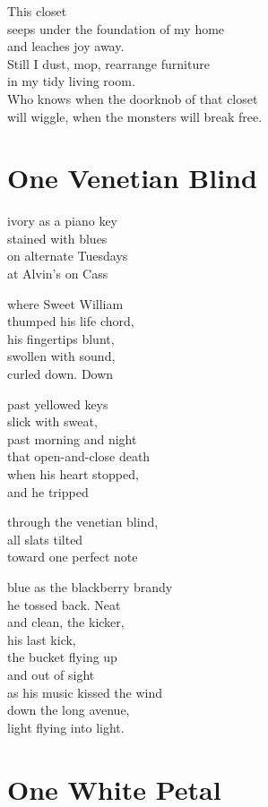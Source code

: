 \documentclass[twoside,10pt]{book}
\begin{document}
This closet\\
seeps under the foundation of my home\\
and leaches joy away.\\
Still I dust, mop, rearrange furniture\\
in my tidy living room.\\
Who knows when the doorknob of that closet\\
will wiggle, when the monsters will break free.


\clearpage
\section{One Venetian Blind}

ivory as a piano key\\
stained with blues\\
on alternate Tuesdays\\
at Alvin's on Cass

where Sweet William\\
thumped his life chord,\\
his fingertips blunt,\\
swollen with sound,\\
curled down. Down

past yellowed keys\\
slick with sweat,\\
past morning and night\\
that open-and-close death\\
when his heart stopped,\\
and he tripped

through the venetian blind,\\
all slats tilted\\
toward one perfect note

blue as the blackberry brandy\\
he tossed back. Neat\\
and clean, the kicker,\\
his last kick,\\
the bucket flying up\\
and out of sight\\
as his music kissed the wind\\
down the long avenue,\\
light flying into light.


\clearpage
\section{One White Petal}
\end{document}
